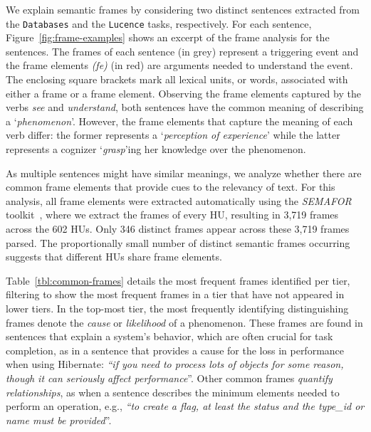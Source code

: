 We explain semantic frames by considering
 two distinct sentences extracted 
from the \texttt{Databases} and the \texttt{Lucence} tasks, respectively.
For each sentence, Figure~\ref{fig:frame-examples} shows an
excerpt of the frame analysis for the sentences. 
The frames of each sentence (in grey) represent a triggering event and the frame elements \textit{(fe)} (in red) are arguments needed to understand the event. The enclosing square brackets mark all lexical units, or words, associated with either a frame or a frame element.
Observing the frame elements captured by the verbs \textit{see} and
\textit{understand}, both sentences have the common meaning of
describing a `\textit{phenomenon}'.
However, the frame elements
that capture the meaning of each verb differ: the former represents a
`\textit{perception of experience}' while the latter represents a
cognizer `\textit{grasp}'ing her knowledge over the 
phenomenon. 



As multiple sentences might have similar meanings,
we analyze whether there are common frame elements 
that provide cues to the relevancy of text.
For this analysis, all frame elements were extracted automatically
using the \textit{SEMAFOR} toolkit~\cite{das2014frame},
where we extract the frames of every HU, resulting in 3,719 frames across
the 602 HUs. Only 346 distinct frames appear across these 3,719 frames
parsed. The proportionally small number of distinct semantic frames
occurring suggests that different HUs share frame elements. 



Table~\ref{tbl:common-frames} details the most frequent frames identified per tier, filtering to show the 
most frequent frames in a tier that have not appeared in lower tiers.
In the top-most tier, the most frequently identifying distinguishing
frames denote the \textit{cause} or \textit{likelihood} of a phenomenon.
These frames are found in sentences that explain a system's behavior, which are often crucial for task completion,
as in a sentence that provides a cause for the loss in performance when using Hibernate:
 \textit{``if you need to process lots of objects for some reason, though it can seriously affect performance}''.
Other common frames \textit{quantify relationships},
as when a sentence describes the minimum elements needed to perform an operation, e.g., \textit{``to create a flag, at least the status and the type\_id or name must be provided}''.




